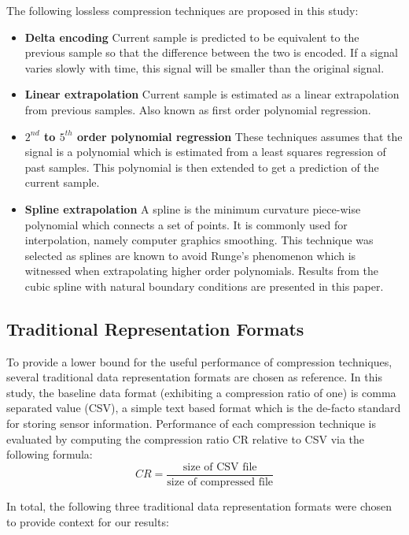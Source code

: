 \documentclass[journal]{IEEEtran}
\begin{document}
The following lossless compression techniques are proposed in this study:
\begin{itemize}
  \item \textbf{Delta encoding} Current sample is predicted to be equivalent to the previous sample so that the difference between the two is encoded. If a signal varies slowly with time, this signal will be smaller than the original signal.
  \item \textbf{Linear extrapolation} Current sample is estimated as a linear extrapolation from previous samples. Also known as first order polynomial regression.
  \item \textbf{\boldmath$2^{nd}$ to \boldmath$5^{th}$ order polynomial regression} These techniques assumes that the signal is a polynomial which is estimated from a least squares regression of past samples. This polynomial is then extended to get a prediction of the current sample.
  \item \textbf{Spline extrapolation} A spline is the minimum curvature piece-wise polynomial which connects a set of points. It is commonly used for interpolation, namely computer graphics smoothing. This technique was selected as splines are known to avoid Runge's phenomenon which is witnessed when extrapolating higher order polynomials. Results from the cubic spline with natural boundary conditions are presented in this paper.
\end{itemize}


\subsection{Traditional Representation Formats}
To provide a lower bound for the useful performance of compression techniques, several traditional data representation formats are chosen as reference. In this study, the baseline data format (exhibiting a compression ratio of one) is comma separated value (CSV), a simple text based format which is the de-facto standard for storing sensor information. Performance of each compression technique is evaluated by computing the compression ratio CR relative to CSV via the following formula:
$$CR = \frac{\textrm{size of CSV file}}{\textrm{size of compressed file}}$$

In total, the following three traditional data representation formats were chosen to provide context for our results:
\end{document}
